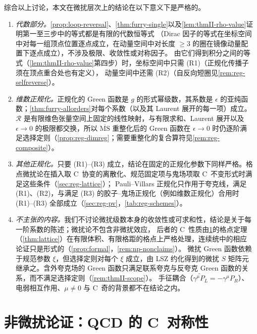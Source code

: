 \documentclass[UTF8,a4paper,11pt,fontset=fandol]{ctexart}
\theoremstyle{cplain}
\theoremstyle{cdefinition}
\theoremstyle{cremark}
\numberwithin{equation}{section}
\newcommand{\Rop}{\mathcal{R}}                       %
\newcommand{\Cconj}[1]{\widetilde{#1}}              %
\begin{document}
综合以上讨论，本文在微扰层次上的结论在以下意义下是严格的。
\begin{enumerate}[label=(\arabic*),leftmargin=2em,itemsep=2pt,topsep=3pt]
\item \emph{代数部分。}\cref{prop:loop-reversal}、\cref{thm:furry-single}以及\cref{lem:thmII-rho-value}证明第一至三步中的等式都是有限的代数恒等式
      （Dirac 因子的等式在坐标空间中对每一组顶点位置逐点成立，在动量空间中对长度 $\ge3$ 的圈在镜像动量配置下逐点成立），不涉及极限、收敛性或对称因子。
      由它们得到积分之间的等式（\cref{lem:thmII-rho-value}第四步）时，坐标空间中只需 (R1)（正规化传播子须在顶点重合处也有定义），
      动量空间中还需 (R2)（自反向短圈见\cref{rem:reg-selfreverse}）。
\item \emph{维数正规化。}正规化的 Green 函数是 $g$ 的形式幂级数，其系数是 $\epsilon$ 的亚纯函数；\cref{thm:furry-allorders}对每个系数（以及其 Laurent 展开的每一项）成立。
      $\Rop$ 是有限维色张量空间上固定的线性映射，与有限求和、Laurent 展开以及 $\epsilon\to0$ 的极限都交换，所以 $\overline{\mathrm{MS}}$ 重整化后的 Green 函数在 $\epsilon\to0$ 时仍逐阶满足选择定则（\cref{prop:reg-dimreg}；需要重整化的复合算符见\cref{rem:reg-composite}）。
\item \emph{其他正规化。}只要 (R1)--(R3) 成立，结论在固定的正规化参数下同样严格。格点微扰论在插入取 C~协变的离散化、规范固定项与鬼场项取 C~不变形式时满足这些条件（\cref{sec:reg-lattice}）；
      Pauli--Villars 正规化只作用于夸克线，满足 (R1)、(R2)，与满足 (R3) 的胶子--鬼场正规化（例如维数正规化）合用时 (R1)--(R3) 全部成立（\cref{sec:reg-pv}，\cref{tab:reg-schemes}）。
\item \emph{不主张的内容。}我们不讨论微扰级数本身的收敛性或可求和性，结论是关于每一阶系数的陈述；微扰论不包含非微扰效应，
      后者的 C~性质由\cref{sec:nonpert}的格点定理（\cref{thm:lattice}）在有限体积、有限格距的格点上严格处理，连续统中的相应论证只是形式的（\cref{prop:formal}，\cref{rem:np-nonclaims}）。
      微扰 Green 函数依赖于规范参数 $\xi$，但选择定则对每个 $\xi$ 成立，由 LSZ 约化得到的微扰 $S$ 矩阵元继承之。含外夸克场的 Green 函数只满足联系夸克与反夸克 Green 函数的关系，而不满足选择定则（\cref{rem:thmII-scope}）。
      手征耦合（$\Cconj{\gamma^\mu P_L}=-\gamma^\mu P_R$）、电弱相互作用、$\mu\neq0$ 与 C~奇的背景都不在结论之内。
\end{enumerate}

\section{非微扰论证：QCD 的 C~对称性}\label{sec:nonpert}
\end{document}
